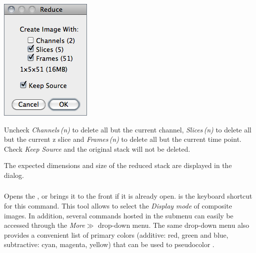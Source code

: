 \begin{minipage}[c][1\totalheight][t]{0.26\columnwidth}%
\includegraphics[scale=0.55]{images/ReduceDimensionality}%
\end{minipage}%
\begin{minipage}[c][1\totalheight][t]{0.74\columnwidth}%
Uncheck\emph{ Channels\,(n)} to delete all but the current channel,
\emph{Slices\,(n)} to delete all but the current z slice and \emph{Frames\,(n)}
to delete all but the current time point. Check\emph{ Keep Source}
and the original stack will not be deleted. \medskip{}


The expected dimensions and size of the reduced stack are displayed
in the dialog.


%
\end{minipage}


\subsubsection{\protect{}\label{sub:Channels...[Z]}}

Opens the , or brings
it to the front if it is already open.  
is the keyboard shortcut for this command. This tool allows to select
the \emph{Display mode }of composite images. In addition, several
commands hosted in the
submenu can easily be accessed through the \emph{More}\textbf{\scriptsize $\gg$}
drop-down menu. The same drop-down menu also provides a convenient
list of primary colors (additive: red, green and blue, subtractive:
cyan, magenta, yellow) that can be used to pseudocolor .

